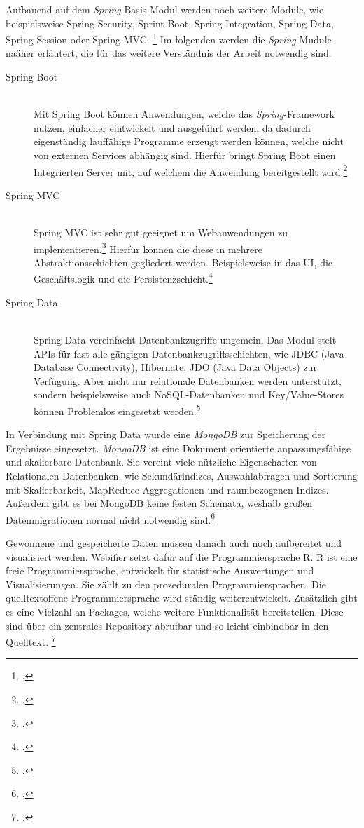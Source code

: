 Aufbauend auf dem \textit{Spring} Basis-Modul werden noch weitere Module, wie beispielsweise Spring Security, Sprint Boot, Spring Integration, Spring Data, Spring Session oder Spring MVC. \footcite[Vgl.][2]{springPivotal} Im folgenden werden die \textit{Spring}-Mudule naäher erläutert, die für das weitere Verständnis der Arbeit notwendig sind.

\begin{description}
  \item[Spring Boot] \hfill \\
    Mit Spring Boot können Anwendungen, welche das \textit{Spring}-Framework nutzen, einfacher eintwickelt und ausgeführt werden, da dadurch eigenständig lauffähige Programme erzeugt werden können, welche nicht von externen Services abhängig sind. Hierfür bringt Spring Boot einen Integrierten Server mit, auf welchem die Anwendung bereitgestellt wird.\footcite[Vgl.][1]{springBoot}
  \item[Spring MVC] \hfill \\
    Spring MVC ist sehr gut geeignet um Webanwendungen zu implementieren.\footcite[Vgl.][3]{spring3} Hierfür können die diese in mehrere Abstraktionsschichten gegliedert werden. Beispielsweise in das \ac{UI}, die Geschäftslogik und die Persistenzschicht.\footcite[Vgl.][21]{springMvc}
  \item[Spring Data] \hfill \\
    Spring Data vereinfacht Datenbankzugriffe ungemein. Das Modul stelt \ac{API}s für fast alle gängigen Datenbankzugriffsschichten, wie JDBC (Java Database Connectivity), Hibernate, JDO (Java Data Objects) zur Verfügung. Aber nicht nur relationale Datenbanken werden unterstützt, sondern beispielsweise auch NoSQL-Datenbanken und Key/Value-Stores können Problemlos eingesetzt werden.\footcite[Vgl.][3f]{springData}
\end{description}

In Verbindung mit Spring Data wurde eine \textit{MongoDB} zur Speicherung der Ergebnisse eingesetzt. \textit{MongoDB} ist eine Dokument orientierte anpassungsfähige und skalierbare Datenbank. Sie vereint viele nützliche Eigenschaften von Relationalen Datenbanken, wie Sekundärindizes, Auswahlabfragen und Sortierung mit Skalierbarkeit, MapReduce-Aggregationen und raumbezogenen Indizes. Außerdem gibt es bei MongoDB keine festen Schemata, weshalb großen Datenmigrationen normal nicht notwendig sind.\footcite[Vgl.][1f]{mongodb}

Gewonnene und gespeicherte Daten müssen danach auch noch aufbereitet und visualisiert werden. Webifier setzt dafür auf die Programmiersprache R. R ist eine freie Programmiersprache, entwickelt für statistische Auswertungen und Visualisierungen. Sie zählt zu den prozeduralen Programmiersprachen. Die quelltextoffene Programmiersprache wird ständig weiterentwickelt. Zusätzlich gibt es eine Vielzahl an Packages, welche weitere Funktionalität bereitstellen. Diese sind über ein zentrales Repository abrufbar und so leicht einbindbar in den Quelltext. \footcite[Vgl.][1ff]{R}


